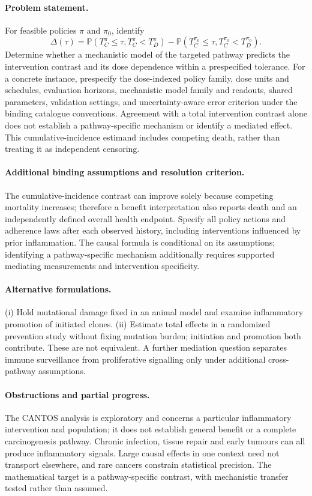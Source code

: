 \documentclass[11pt]{article}
\begin{document}
\paragraph{Problem statement.} For feasible policies $\pi$ and $\pi_0$, identify
\[
\Delta(\tau)=\mathbb{P}(T_C^{\pi}\leq\tau,T_C^{\pi}<T_D^{\pi})
-\mathbb{P}(T_C^{\pi_0}\leq\tau,T_C^{\pi_0}<T_D^{\pi_0}).
\]
Determine whether a mechanistic model of the targeted pathway predicts the intervention contrast and its dose dependence within a prespecified tolerance. For a concrete instance, prespecify the dose-indexed policy family, dose units and schedules, evaluation horizons, mechanistic model family and readouts, shared parameters, validation settings, and uncertainty-aware error criterion under the binding catalogue conventions. Agreement with a total intervention contrast alone does not establish a pathway-specific mechanism or identify a mediated effect. This cumulative-incidence estimand includes competing death, rather than treating it as independent censoring.

\paragraph{Additional binding assumptions and resolution criterion.} The cumulative-incidence contrast can improve solely because competing mortality increases; therefore a benefit interpretation also reports death and an independently defined overall health endpoint. Specify all policy actions and adherence laws after each observed history, including interventions influenced by prior inflammation. The causal formula is conditional on its assumptions; identifying a pathway-specific mechanism additionally requires supported mediating measurements and intervention specificity.

\paragraph{Alternative formulations.} (i) Hold mutational damage fixed in an animal model and examine inflammatory promotion of initiated clones. (ii) Estimate total effects in a randomized prevention study without fixing mutation burden; initiation and promotion both contribute. These are not equivalent. A further mediation question separates immune surveillance from proliferative signalling only under additional cross-pathway assumptions.

\paragraph{Obstructions and partial progress.} The CANTOS analysis is exploratory and concerns a particular inflammatory intervention and population; it does not establish general benefit or a complete carcinogenesis pathway. Chronic infection, tissue repair and early tumours can all produce inflammatory signals. Large causal effects in one context need not transport elsewhere, and rare cancers constrain statistical precision. The mathematical target is a pathway-specific contrast, with mechanistic transfer tested rather than assumed.
\end{document}
